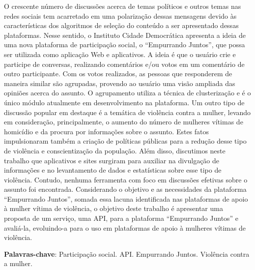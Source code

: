 \begin{resumo}
O crescente número de discussões acerca de temas políticos e outros temas nas redes sociais tem acarretado em uma polarização 
dessas mensagens devido às características dos algoritmos de seleção do conteúdo a ser apresentado dessas plataformas. 
Nesse sentido, o Instituto Cidade Democrática 
apresenta a ideia de uma nova plataforma de participação social, o ``Empurrando Juntos'', que possa ser utilizada como aplicação Web e aplicativos. 
A ideia é que o 
usuário crie e participe de conversas, realizando comentários e/ou votos em um comentário de outro participante. Com os votos realizados, as pessoas que 
responderem de maneira similar são agrupadas, provendo ao usuário uma visão ampliada das opiniões acerca do assunto. O agrupamento utiliza a técnica de 
clusterização e é o único módulo atualmente em desenvolvimento na plataforma. Um outro tipo de discussão popular em destaque é a 
temática de violência 
contra a mulher, levando em consideração, principalmente, o aumento do número de mulheres vítimas de homicídio e da procura por informações sobre o assunto. 
Estes fatos impulsionaram também a criação de políticas públicas para a redução desse tipo de violência e conscientização da população. 
Além disso, discutimos neste trabalho que aplicativos e sites surgiram para auxiliar na divulgação de informações e no 
levantamento de dados e estatísticas sobre esse tipo de violência. 
Contudo, nenhuma ferramenta com foco em discussões efetivas sobre o assunto foi encontrada. Considerando 
o objetivo e as necessidades da plataforma ``Empurrando Juntos'', somada essa lacuna identificada nas plataformas de apoio à mulher
vítima de violência, o objetivo deste trabalho é apresentar uma proposta de um serviço, uma API, 
para a plataforma 
``Empurrando Juntos'' e avaliá-la, evoluindo-a para o uso em plataformas de apoio à mulheres vítimas de violência. 
\vspace{\onelineskip}
  
\noindent
\textbf{Palavras-chave}: Participação social. API. Empurrando Juntos. Violência contra a mulher.
\end{resumo}

